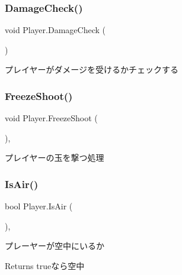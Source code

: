 \subsubsection{\texorpdfstring{Damage\+Check()}{DamageCheck()}}
{\footnotesize\ttfamily void Player.\+Damage\+Check (\begin{DoxyParamCaption}{ }\end{DoxyParamCaption})\hspace{0.3cm}{\ttfamily [inline]}}



プレイヤーがダメージを受けるかチェックする 

\mbox{\label{class_player_a2c4d3671ace6954258733b6f49c68764}} 
\subsubsection{\texorpdfstring{Freeze\+Shoot()}{FreezeShoot()}}
{\footnotesize\ttfamily void Player.\+Freeze\+Shoot (\begin{DoxyParamCaption}{ }\end{DoxyParamCaption})\hspace{0.3cm}{\ttfamily [inline]}, {\ttfamily [private]}}



プレイヤーの玉を撃つ処理 

\mbox{\label{class_player_a9d75eb5e439284a9e14334de881e59c3}} 
\subsubsection{\texorpdfstring{Is\+Air()}{IsAir()}}
{\footnotesize\ttfamily bool Player.\+Is\+Air (\begin{DoxyParamCaption}{ }\end{DoxyParamCaption})\hspace{0.3cm}{\ttfamily [inline]}, {\ttfamily [private]}}



プレーヤーが空中にいるか 

\begin{DoxyReturn}{Returns}
trueなら空中
\end{DoxyReturn}
\mbox{\label{class_player_ab2fd8fba7de97ea1d0c4e7821d29c661}} 
